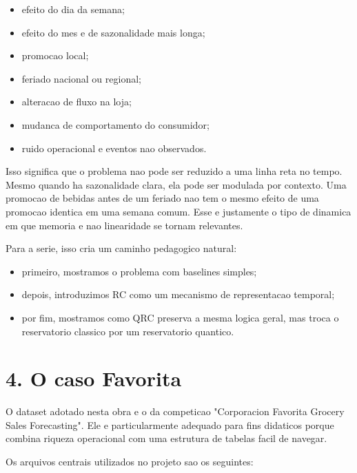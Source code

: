 \documentclass[12pt]{article}
\providecommand{\tightlist}{%
  \setlength{\itemsep}{0pt}\setlength{\parskip}{0pt}}
\begin{document}
\begin{itemize}
\tightlist
\item
  efeito do dia da semana;
\item
  efeito do mes e de sazonalidade mais longa;
\item
  promocao local;
\item
  feriado nacional ou regional;
\item
  alteracao de fluxo na loja;
\item
  mudanca de comportamento do consumidor;
\item
  ruido operacional e eventos nao observados.
\end{itemize}

Isso significa que o problema nao pode ser reduzido a uma linha reta no tempo. Mesmo quando ha sazonalidade clara, ela pode ser modulada por contexto. Uma promocao de bebidas antes de um feriado nao tem o mesmo efeito de uma promocao identica em uma semana comum. Esse e justamente o tipo de dinamica em que memoria e nao linearidade se tornam relevantes.

Para a serie, isso cria um caminho pedagogico natural:

\begin{itemize}
\tightlist
\item
  primeiro, mostramos o problema com baselines simples;
\item
  depois, introduzimos RC como um mecanismo de representacao temporal;
\item
  por fim, mostramos como QRC preserva a mesma logica geral, mas troca o reservatorio classico por um reservatorio quantico.
\end{itemize}

\section{4. O caso Favorita}\label{4-o-caso-favorita}

O dataset adotado nesta obra e o da competicao "Corporacion Favorita Grocery Sales Forecasting". Ele e particularmente adequado para fins didaticos porque combina riqueza operacional com uma estrutura de tabelas facil de navegar.

Os arquivos centrais utilizados no projeto sao os seguintes:
\end{document}

